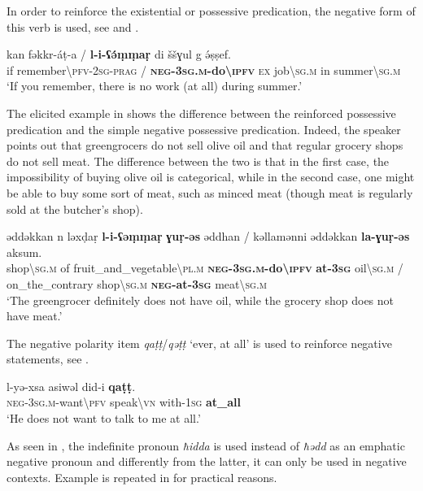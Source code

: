 \documentclass[output=paper,colorlinks,citecolor=brown]{langscibook}
\begin{document}
In order to reinforce the existential or possessive predication, the negative form of this verb is used, see  and .

\ea\label{ex:siw:67}
    \gll kan fəkkr-áṭ-a / \textbf{l-i-ʕə́ṃṃaṛ} di ššɣul g ə́ṣṣef. \\
         if remember{\textbackslash}\textsc{pfv-2sg-prag} / \textbf{\textsc{neg-3sg.m-}do{\textbackslash}\textsc{ipfv}} \textsc{ex} job{\textbackslash}\textsc{sg.m} in summer{\textbackslash}\textsc{sg.m} \\
    \glt ‘If you remember, there is no work (at all) during summer.’
\z

The elicited example in  shows the difference between the reinforced possessive predication and the simple negative possessive predication. Indeed, the speaker points out that greengrocers do not sell olive oil and that regular grocery shops do not sell meat. The difference between the two is that in the first case, the impossibility of buying olive oil is categorical, while in the second case, one might be able to buy some sort of meat, such as minced meat (though meat is regularly sold at the butcher's shop).

\ea\label{ex:siw:68}
    \gll əddəkkan n ləxḍaṛ \textbf{l-i-ʕəṃṃaṛ} \textbf{ɣuṛ-əs} əddhan / kəllamənni əddəkkan \textbf{la-ɣuṛ-əs} aksum. \\
         shop{\textbackslash}\textsc{sg.m} of fruit\_and\_vegetable{\textbackslash}\textsc{pl.m} \textbf{\textsc{neg-3sg.m}-do{\textbackslash}\textsc{ipfv}} \textbf{at-\textsc{3sg}} oil{\textbackslash}\textsc{sg.m} / on\_the\_contrary shop{\textbackslash}\textsc{sg.m} \textbf{\textsc{neg-}at\textsc{{}-3sg}} meat{\textbackslash}\textsc{sg.m} \\
    \glt ‘The greengrocer definitely does not have oil, while the grocery shop does not have meat.’
\z

The negative polarity item \textit{qaṭṭ}/\textit{qəṭṭ} ‘ever, at all’ is used to reinforce negative statements, see .

\ea\label{ex:siw:69}
    \gll l-yə-xsa asiwəl did-i \textbf{qaṭṭ}. \\
         \textsc{neg-3sg.m}-want{\textbackslash}\textsc{pfv} speak{\textbackslash}\textsc{vn} with-\textsc{1sg} \textbf{at\_all} \\
    \glt ‘He does not want to talk to me at all.’
\z

As seen in , the indefinite pronoun \textit{ħidda} is used instead of \textit{ħədd} as an emphatic negative pronoun and differently from the latter, it can only be used in negative contexts. Example  is repeated in  for practical reasons.
\end{document}
